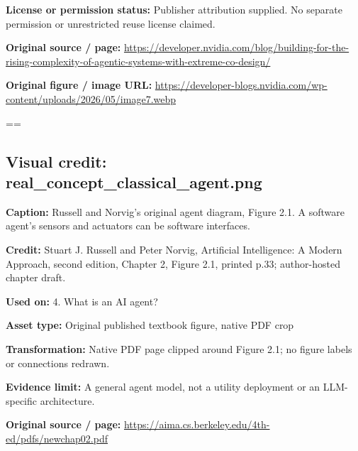 \documentclass[10pt,letterpaper]{article}
\begin{document}
\textbf{License or permission status:} Publisher attribution supplied. No separate permission or unrestricted reuse license claimed.\par
\textbf{Original source / page:} \href{https://developer.nvidia.com/blog/building-for-the-rising-complexity-of-agentic-systems-with-extreme-co-design/}{\small\ttfamily https:/\allowbreak{}/\allowbreak{}developer.\allowbreak{}nvidia.\allowbreak{}com/\allowbreak{}blog/\allowbreak{}building-\allowbreak{}for-\allowbreak{}the-\allowbreak{}rising-\allowbreak{}complexity-\allowbreak{}of-\allowbreak{}agentic-\allowbreak{}systems-\allowbreak{}with-\allowbreak{}extreme-\allowbreak{}co-\allowbreak{}design/\allowbreak{}}\par
\textbf{Original figure / image URL:} \href{https://developer-blogs.nvidia.com/wp-content/uploads/2026/05/image7.webp}{\small\ttfamily https:/\allowbreak{}/\allowbreak{}developer-\allowbreak{}blogs.\allowbreak{}nvidia.\allowbreak{}com/\allowbreak{}wp-\allowbreak{}content/\allowbreak{}uploads/\allowbreak{}2026/\allowbreak{}05/\allowbreak{}image7.\allowbreak{}webp}\par
\egroup\par\noindent\box\readingEntry\par\medskip
\setbox\readingEntry=\vbox\bgroup\hsize=\linewidth\subsection*{Visual credit: real\_concept\_classical\_agent.png}
\textbf{Caption:} Russell and Norvig's original agent diagram, Figure 2.1. A software agent's sensors and actuators can be software interfaces.\par
\textbf{Credit:} Stuart J. Russell and Peter Norvig, Artificial Intelligence: A Modern Approach, second edition, Chapter 2, Figure 2.1, printed p.33; author-hosted chapter draft.\par
\textbf{Used on:} 4. What is an AI agent?\par
\textbf{Asset type:} Original published textbook figure, native PDF crop\par
\textbf{Transformation:} Native PDF page clipped around Figure 2.1; no figure labels or connections redrawn.\par
\textbf{Evidence limit:} A general agent model, not a utility deployment or an LLM-specific architecture.\par
\textbf{Original source / page:} \href{https://aima.cs.berkeley.edu/4th-ed/pdfs/newchap02.pdf}{\small\ttfamily https:/\allowbreak{}/\allowbreak{}aima.\allowbreak{}cs.\allowbreak{}berkeley.\allowbreak{}edu/\allowbreak{}4th-\allowbreak{}ed/\allowbreak{}pdfs/\allowbreak{}newchap02.\allowbreak{}pdf}\par
\end{document}
